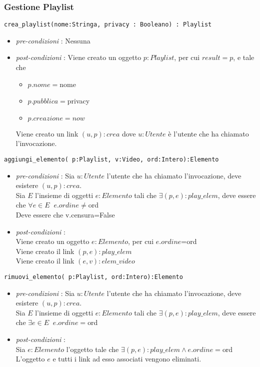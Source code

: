 \documentclass[12pt, letterpaper]{article}
\newcommand{\code}[1]{\colorbox{light-gray}{\texttt{#1}}}
\newcommand{\id}{{\hphantom{ident}}}
\begin{document}
\subsubsection{Gestione Playlist}
\code{crea\_playlist(nome:Stringa, privacy : Booleano) : Playlist}\begin{itemize}
    \item \textit{pre-condizioni} : Nessuna
    \item \textit{post-condizioni} : Viene creato un oggetto $p:Playlist$, per cui $result=p$,
          e tale che \begin{itemize}
              \item $p.nome=$nome
              \item $p.pubblica=$privacy
              \item $p.creazione=now$
          \end{itemize}
          Viene creato un link $(u,p):crea$ dove $u:Utente$ è l'utente che ha chiamato l'invocazione.
\end{itemize}
\code{aggiungi\_elemento( p:Playlist, v:Video, ord:Intero):Elemento}\begin{itemize}
    \item \textit{pre-condizioni} : Sia $u:Utente$ l'utente che ha chiamato l'invocazione,
          deve esistere $(u,p):crea$. \\
          Sia $E$ l'insieme di oggetti $e:Elemento$ tali che $\exists (p,e):play\_elem$, deve
          essere che $\forall e\in E\;\;e.ordine\ne$ord \\
          Deve essere che v.censura=False
    \item \textit{post-condizioni} : \\\id Viene creato un oggetto $e:Elemento$, per cui $e.ordine$=ord\\
          \id Viene creato il link $(p,e):play\_elem$ \\
          \id Viene creato il link $(e,v):elem\_video$
\end{itemize}
\code{rimuovi\_elemento( p:Playlist, ord:Intero):Elemento}\begin{itemize}
    \item \textit{pre-condizioni} : Sia $u:Utente$ l'utente che ha chiamato l'invocazione,
          deve esistere $(u,p):crea$. \\
          Sia $E$ l'insieme di oggetti $e:Elemento$ tali che $\exists (p,e):play\_elem$, deve
          essere che $\exists e\in E\;\;e.ordine=$ord
    \item \textit{post-condizioni} : \\
          \id  Sia $e:Elemento$ l'oggetto tale che $\exists (p,e):play\_elem\land e.ordine=$ord\\
          \id L'oggetto $e$ e tutti i link ad esso associati vengono eliminati.
\end{itemize}
\end{document}
